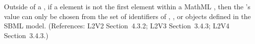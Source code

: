 Outside of a \FunctionDefinition, if a  element is not
the first element within a MathML , then the
's value can only be chosen from the set of identifiers
of \Species, \Compartment, \Parameter or \Reaction objects defined
in the SBML model.  (References: L2V2 Section~4.3.2; L2V3
Section~3.4.3; L2V4 Section~3.4.3.)
